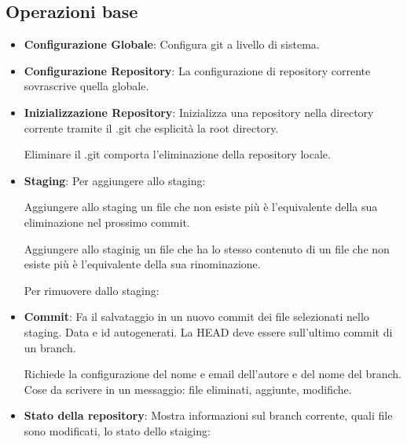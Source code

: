 \subsection{Operazioni base}
\begin{itemize}
	\item \textbf{Configurazione Globale}: Configura git a livello di sistema.


	\item \textbf{Configurazione Repository}: La configurazione di repository corrente sovrascrive quella globale.


	\item \textbf{Inizializzazione Repository}: Inizializza una repository nella directory corrente tramite il .git che esplicità la root directory.


	Eliminare il .git comporta l'eliminazione della repository locale.

	\item \textbf{Staging}: Per aggiungere allo staging:


	Aggiungere allo staging un file che non esiste più è l'equivalente della sua eliminazione nel prossimo commit.

	Aggiungere allo staginig un file che ha lo stesso contenuto di un file che non esiste più è l'equivalente della sua rinominazione.

	Per rimuovere dallo staging:


	\item \textbf{Commit}: Fa il salvataggio in un nuovo commit dei file selezionati nello staging. Data e id autogenerati.
	La HEAD deve essere sull'ultimo commit di un branch.


	Richiede la configurazione del nome e email dell'autore e del nome del branch.
	Cose da scrivere in un messaggio: file eliminati, aggiunte, modifiche.

	\item \textbf{Stato della repository}: Mostra informazioni sul branch corrente, quali file sono modificati, lo stato dello staiging:



\end{itemize}
